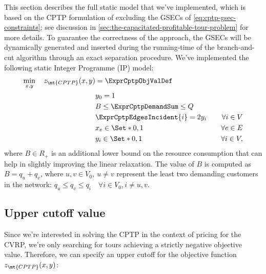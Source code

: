 This section describes the full static model that we've implemented,
which is based on the CPTP formulation of 
excluding the GSECs of \cref{eq:cptp-gsec-constraints};
see discussion in \cref{sec:the-capacitated-profitable-tour-problem} for more details.
To guarantee the correctness of the approach,
the GSECs will be dynamically generated and inserted
during the running-time of the branch-and-cut algorithm
through an exact separation procedure.
We've implemented the following static Integer Programme (IP) model:
\begin{align}
	\min_{x,y} \quad z_\mt{CPTP}(x, y) & = \ExprCptpObjValDef                                              \\
	                                   & y_0 = 1                                  &                        \\
	                                   & B \le   \ExprCptpDemandSum   \le Q       &                        \\
	                                   & \ExprCptpEdgesIncident{i}    = 2 y_i     & \quad \forall i \in V  \\
	                                   & x_{e}                   \in \Set*{0, 1}  & \quad \forall e \in E  \\
	                                   & y_{i}                    \in \Set*{0, 1} & \quad \forall i \in V,
\end{align}
where $B \in R_+$ is an additional lower bound on the resource consumption that can help in slightly improving the linear relaxation.
The value of $B$ is computed as $B = q_u + q_v$, where $u, v \in V_0,\ u \ne v$
represent the least two demanding customers in the network: $q_u \le q_v \le q_i \quad \forall i \in V_0, i \ne u, v$.

\subsection{Upper cutoff value}
\label{sec:impl-upper-cutoff-value}

Since we're interested in solving the CPTP in the context of pricing for the CVRP, we're only searching for tours achieving a strictly negative objective value.
Therefore, we can specify an upper cutoff for the objective function $z_\mt{CPTP}(x, y)$:

